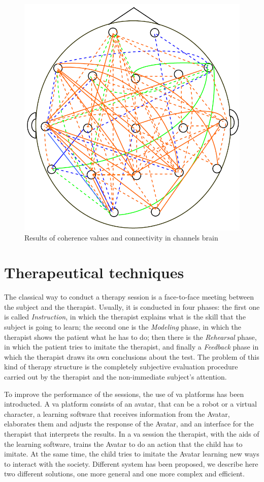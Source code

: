 \documentclass[12pt,journal,draftclsnofoot,onecolumn]{IEEEtran}
\begin{document}
\begin{figure}
\centering
\includegraphics[width = .5\textwidth]{head.png}
\caption{Results of coherence values and connectivity in channels brain}
\label{fig:head}
\end{figure}

\section{Therapeutical techniques}
\label{sec:thera_tech}

The classical way to conduct a therapy session is a face-to-face meeting between the subject and the therapist.
Usually, it is conducted in four phases: the first one is called \textit{Instruction}, in which the therapist explains what is the skill that the subject is going to learn; the second one is the \textit{Modeling} phase, in which the therapist shows the patient what he has to do; then there is the \textit{Rehearsal} phase, in which the patient tries to imitate the therapist, and finally a \textit{Feedback} phase in which the therapist draws its own conclusions about the test.
The problem of this kind of therapy structure is the completely subjective evaluation procedure carried out by the therapist and the non-immediate subject's attention.

To improve the performance of the sessions, the use of \gls{va} platforms has been introducted.
A \gls{va} platform consists of an avatar, that can be a robot or a virtual character, a learning software that receives information from the Avatar, elaborates them and adjusts the response of the Avatar, and an interface for the therapist that interprets the results.
In a \gls{va} session the therapist, with the aids of the learning software, trains the Avatar to do an action that the child has to imitate. At the same time, the child tries to imitate the Avatar learning new ways to interact with the society.
Different system has been proposed, we describe here two different solutions, one more general and one more complex and efficient.
\end{document}
